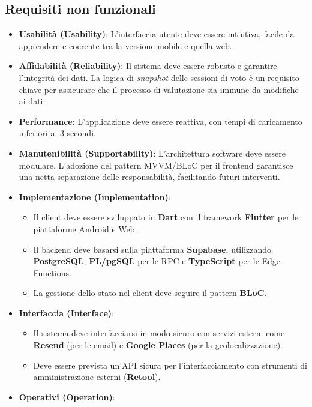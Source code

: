 \subsection{Requisiti non funzionali}\label{subsec:requisiti-non-funzionali}
\begin{itemize}
    \item \textbf{Usabilità (Usability)}: L'interfaccia utente deve essere intuitiva, facile da apprendere e coerente tra la versione mobile e quella web.
    \item \textbf{Affidabilità (Reliability)}: Il sistema deve essere robusto e garantire l'integrità dei dati.
    La logica di \emph{snapshot} delle sessioni di voto è un requisito chiave per assicurare che il processo di valutazione sia immune da modifiche ai dati.
    \item \textbf{Performance}: L'applicazione deve essere reattiva, con tempi di caricamento inferiori ai 3 secondi.
    \item \textbf{Manutenibilità (Supportability)}: L'architettura software deve essere modulare.
    L'adozione del pattern MVVM/BLoC per il frontend garantisce una netta separazione delle responsabilità, facilitando futuri interventi.
    \item \textbf{Implementazione (Implementation)}:
    \begin{itemize}
        \item Il client deve essere sviluppato in \textbf{Dart} con il framework \textbf{Flutter} per le piattaforme Android e Web.
        \item Il backend deve basarsi sulla piattaforma \textbf{Supabase}, utilizzando \textbf{PostgreSQL}, \textbf{PL/pgSQL} per le RPC e \textbf{TypeScript} per le Edge Functions.
        \item La gestione dello stato nel client deve seguire il pattern \textbf{BLoC}.
    \end{itemize}
    \item \textbf{Interfaccia (Interface)}:
    \begin{itemize}
        \item Il sistema deve interfacciarsi in modo sicuro con servizi esterni come \textbf{Resend} (per le email) e \textbf{Google Places} (per la geolocalizzazione).
        \item Deve essere prevista un'API sicura per l'interfacciamento con strumenti di amministrazione esterni (\textbf{Retool}).
    \end{itemize}
    \item \textbf{Operativi (Operation)}:

\end{itemize}
